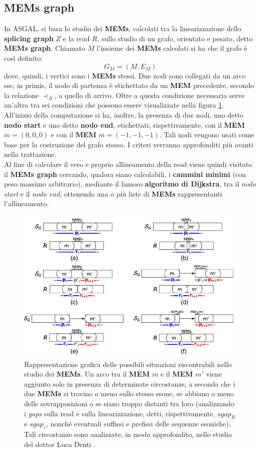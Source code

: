 \documentclass[a4paper,12pt, oneside]{book}
\begin{document}
\subsection{MEMs graph}
In ASGAL, si basa lo studio dei \textbf{MEMs}, calcolati tra la linearizzazione
dello \textbf{splicing graph} $Z$ e la read $R$, sullo studio di un grafo,
orientato e pesato, detto \textbf{MEMs graph}. Chiamato $M$ l'insieme dei
\textbf{MEMs} calcolati si ha che il grafo è così definito: 
\[G_M=(M,E_M)\]
dove, quindi, i vertici sono i \textbf{MEMs} stessi. Due nodi sono collegati da
un arco sse, in primis, il nodo di partenza è etichettato da un \textbf{MEM}
precedente, secondo la relazione $\prec_R$, a quello di arrivo. Oltre a questa
condizione necessaria serve un'altra tra sei condizioni che possono essere
visualizzate nella figura \ref{fig:mem}.\\
All'inizio della computazione si ha, inoltre, la presenza di due nodi, uno detto
\textbf{nodo start} e uno detto \textbf{nodo end}, etichettati, rispettivamente,
con il \textbf{MEM} $m=(0,0,0)$ e con il \textbf{MEM} $m=(-1,-1,-1)$. Tali nodi
vengono usati come base per la costruzione del grafo stesso. I criteri verranno
approfonditi più avanti nella trattazione.\\ 
Al fine di calcolare il vero e proprio allineamento della read viene quindi
visitato il \textbf{MEMs graph} cercando, qualora siano calcolabili, i
\textbf{cammini   minimi} (con peso massimo arbitrario), mediante il famoso
\textbf{algoritmo di Dijkstra}, tra il \textit{nodo start} e il \textit{nodo
  end}, ottenendo una o più liste di \textbf{MEMs} rappresentanti
l'allineamento.   
\begin{figure}
  \centering
  \includegraphics[scale = 0.45]{img/mg.png}
  \caption{Rappresentazione grafica \cite{denti} delle possibili situazioni
    riscontrabili 
    nello studio dei \textbf{MEMs}. Un arco tra il \textbf{MEM} $m$ e
    il \textbf{MEM} $m'$ viene aggiunto solo in presenza di determinate
    circostanze, a seconda che i due \textbf{MEMs} si trovino o meno sullo
    stesso esone, se abbiano o meno delle sovrapposizioni o se siano troppo
    distanti tra loro (analizzando i \emph{gaps} sulla read e
    sulla linearizzazione, detti, rispettivamente, $sgap_R$ e $sgap_z$, nonché
    eventuali suffissi e prefissi delle sequenze esoniche). Tali circostanze
    sono analizzate, in modo approfondito, nello studio del dottor Luca Denti
    \cite{denti}.}  
  \label{fig:mem}
\end{figure}
\end{document}
